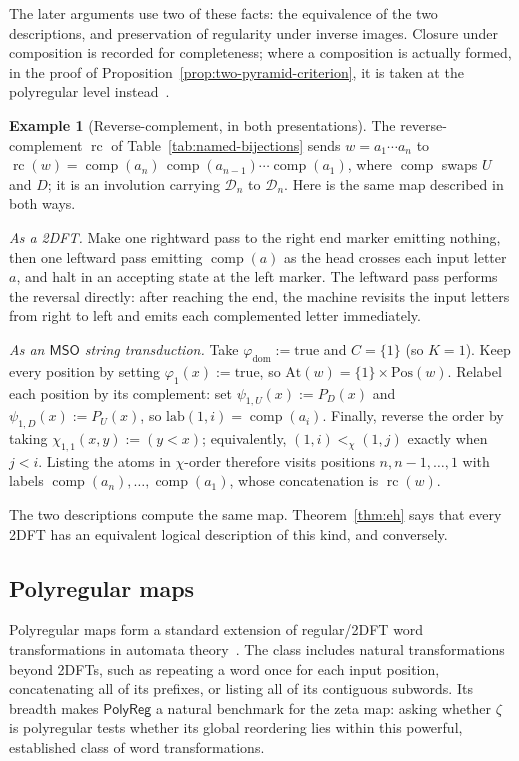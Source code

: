 \documentclass[11pt]{article}
\theoremstyle{definition}
\newtheorem{example}[theorem]{Example}
\newcommand{\D}{\mathcal D}
\newcommand{\MSO}{\mathsf{MSO}}
\newcommand{\polyreg}{\mathsf{PolyReg}}
\newcommand{\rc}{\operatorname{rc}}
\newcommand{\comp}{\operatorname{comp}}
\begin{document}
The later arguments use two of these facts: the equivalence of the two
descriptions, and preservation of regularity under inverse images.  Closure
under composition is recorded for completeness; where a composition is
actually formed, in the proof of
Proposition~\ref{prop:two-pyramid-criterion}, it is taken at the polyregular
level instead~\cite{Bojanczyk2018}.

\begin{example}[Reverse-complement, in both presentations]\label{ex:rc-two-ways}
The reverse-complement $\rc$ of Table~\ref{tab:named-bijections} sends
$w=a_1\cdots a_n$ to $\rc(w)=\comp(a_n)\,\comp(a_{n-1})\cdots\comp(a_1)$, where
$\comp$ swaps $U$ and $D$; it is an involution carrying $\D_n$ to $\D_n$.  Here
is the same map described in both ways.

\vspace{0.5em}
\noindent\emph{As a 2DFT.}  Make one rightward pass to the right end marker emitting
nothing, then one leftward pass emitting $\comp(a)$ as the head crosses each
input letter $a$, and halt in an accepting state at the left marker.  The
leftward pass performs the reversal directly: after reaching the end, the
machine revisits the input letters from right to left and emits each
complemented letter immediately.

\vspace{0.5em}
\noindent\emph{As an $\MSO$ string transduction.}  Take
$\varphi_{\mathrm{dom}}:=\mathrm{true}$ and $C=\{1\}$ (so $K=1$).  Keep every
position by setting $\varphi_1(x):=\mathrm{true}$, so
$\mathrm{At}(w)=\{1\}\times\mathrm{Pos}(w)$.  Relabel each position by its
complement: set $\psi_{1,U}(x):=P_D(x)$ and
$\psi_{1,D}(x):=P_U(x)$, so $\mathrm{lab}(1,i)=\comp(a_i)$.  Finally, reverse
the order by taking $\chi_{1,1}(x,y):=(y<x)$; equivalently,
$(1,i)<_\chi(1,j)$ exactly when $j<i$.  Listing the atoms in $\chi$-order
therefore visits positions $n,n-1,\ldots,1$ with labels
$\comp(a_n),\ldots,\comp(a_1)$, whose concatenation is $\rc(w)$.

The two descriptions compute the same map.  Theorem~\ref{thm:eh} says that
every 2DFT has an equivalent logical description of this kind, and conversely.
\end{example}

\subsection{Polyregular maps}

Polyregular maps form a standard extension of regular/2DFT word transformations
in automata theory~\cite{Bojanczyk2018}.  The class includes
natural transformations beyond 2DFTs, such as repeating a word once for each
input position, concatenating all of its prefixes, or listing all of its
contiguous subwords.  Its breadth makes $\polyreg$ a natural benchmark for the zeta map:
asking whether $\zeta$ is polyregular tests whether its global reordering lies
within this powerful, established class of word transformations.
\end{document}
